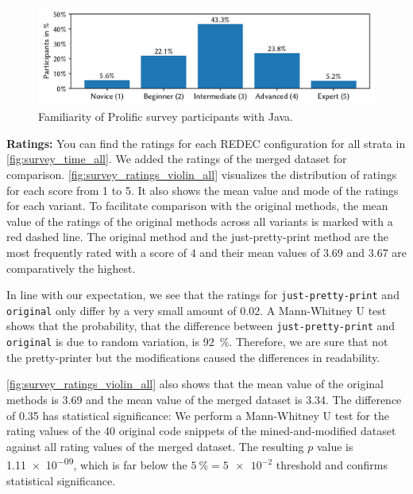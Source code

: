 \documentclass[%
class=scrreprt,
chapterprefix=false,%
open=right,%
twoside=false,%
paper=a4,%
logofile={Logo\_zentral\_farbig\_EN.png},%
thesistype=master,%
UKenglish,%
]{se2thesis}
\theoremstyle{definition}
\newcommand{\rdh}{REDEC\xspace}
\newcommand{\none}{just-pretty-print\xspace} %
\newcommand{\nonet}{\texttt{\none}\xspace} %
\begin{document}
	\begin{figure}[tb]
		\centering
		\includegraphics[width=\textwidth]{img/survey_java_familiarity_bar.pdf}
		\caption{Familiarity of Prolific survey participants with Java.}
		\label{fig:survey_Java_familiarity_pie}
	\end{figure}
		
	\textbf{Ratings:}
	You can find the ratings for each \rdh configuration for all strata in \autoref{fig:survey_time_all}. We added the ratings of the merged dataset for comparison. \autoref{fig:survey_ratings_violin_all} visualizes the distribution of ratings for each score from 1 to 5. It also shows the mean value and mode of the ratings for each variant. To facilitate comparison with the original methods, the mean value of the ratings of the original methods across all variants is marked with a red dashed line. The original method and the just-pretty-print method are the most frequently rated with a score of 4 and their mean values of 3.69 and 3.67 are comparatively the highest.
	
	In line with our expectation, we see that the ratings for \nonet and \texttt{original} only differ by a very small amount of 0.02. A Mann-Whitney U test shows that the probability, that the difference between \nonet and \texttt{original} is due to random variation, is 92~\%.
	Therefore, we are sure that not the pretty-printer but the modifications caused the differences in readability.
		
	\autoref{fig:survey_ratings_violin_all} also shows that the mean value of the original methods is 3.69 and the mean value of the merged dataset is 3.34. The difference of 0.35 has statistical significance:
	We perform a Mann-Whitney U test for the rating values of the 40 original code snippets of the mined-and-modified dataset against all rating values of the merged dataset. The resulting $p$ value is \num{1.11e-09}, which is far below the $5~\%=\num{5e-2}$ threshold and confirms statistical significance.
	
\end{document}
